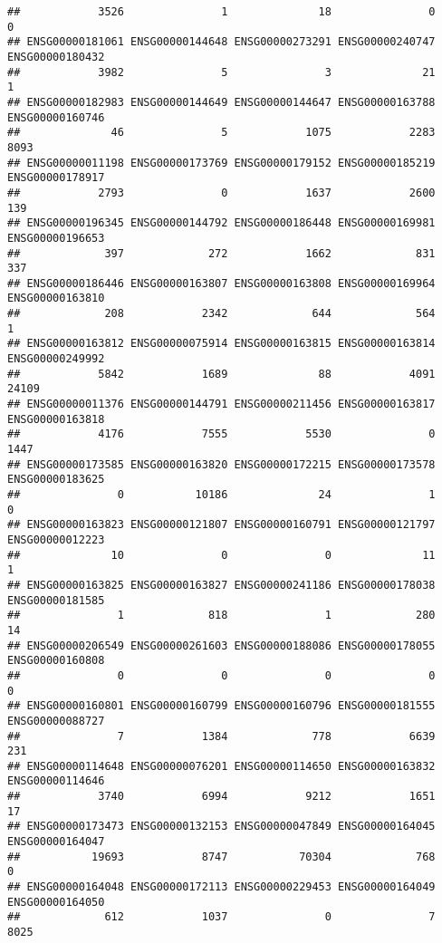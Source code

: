 \documentclass[
]{article}
\begin{document}
\begin{verbatim}
##            3526               1              18               0               0 
## ENSG00000181061 ENSG00000144648 ENSG00000273291 ENSG00000240747 ENSG00000180432 
##            3982               5               3              21               1 
## ENSG00000182983 ENSG00000144649 ENSG00000144647 ENSG00000163788 ENSG00000160746 
##              46               5            1075            2283            8093 
## ENSG00000011198 ENSG00000173769 ENSG00000179152 ENSG00000185219 ENSG00000178917 
##            2793               0            1637            2600             139 
## ENSG00000196345 ENSG00000144792 ENSG00000186448 ENSG00000169981 ENSG00000196653 
##             397             272            1662             831             337 
## ENSG00000186446 ENSG00000163807 ENSG00000163808 ENSG00000169964 ENSG00000163810 
##             208            2342             644             564               1 
## ENSG00000163812 ENSG00000075914 ENSG00000163815 ENSG00000163814 ENSG00000249992 
##            5842            1689              88            4091           24109 
## ENSG00000011376 ENSG00000144791 ENSG00000211456 ENSG00000163817 ENSG00000163818 
##            4176            7555            5530               0            1447 
## ENSG00000173585 ENSG00000163820 ENSG00000172215 ENSG00000173578 ENSG00000183625 
##               0           10186              24               1               0 
## ENSG00000163823 ENSG00000121807 ENSG00000160791 ENSG00000121797 ENSG00000012223 
##              10               0               0              11               1 
## ENSG00000163825 ENSG00000163827 ENSG00000241186 ENSG00000178038 ENSG00000181585 
##               1             818               1             280              14 
## ENSG00000206549 ENSG00000261603 ENSG00000188086 ENSG00000178055 ENSG00000160808 
##               0               0               0               0               0 
## ENSG00000160801 ENSG00000160799 ENSG00000160796 ENSG00000181555 ENSG00000088727 
##               7            1384             778            6639             231 
## ENSG00000114648 ENSG00000076201 ENSG00000114650 ENSG00000163832 ENSG00000114646 
##            3740            6994            9212            1651              17 
## ENSG00000173473 ENSG00000132153 ENSG00000047849 ENSG00000164045 ENSG00000164047 
##           19693            8747           70304             768               0 
## ENSG00000164048 ENSG00000172113 ENSG00000229453 ENSG00000164049 ENSG00000164050 
##             612            1037               0               7            8025 

\end{verbatim}
\end{document}
